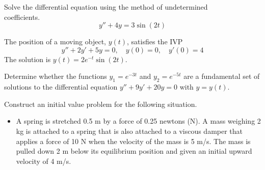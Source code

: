 \documentclass[12pt]{exam}
\begin{document}
\begin{questions}

    \newpage
    
    \question[8] Solve the differential equation using the method of undetermined \\coefficients. $$y'' + 4y = 3 \sin(2t)$$
    

    \newpage 
    

    \vspace{4cm} 
    
    \question[8] The position of a moving object, $y(t)$, satisfies the IVP $$y''+2y'+5y=0, \quad y(0) = 0, \quad y'(0) = 4$$ The solution is $y(t)= 2e^{-t}\sin(2t)$. 
    
    
    \newpage
    \question[2] Determine whether the functions $y_1 = e^{-3t}$ and $y_2 = e^{-5t}$ are a fundamental set of solutions to the differential equation $y''+9y'+20y = 0$ with $y=y(t)$. \vspace{4cm}
    
    \question[4]  Construct an initial value problem for the following situation. 

    \begin{itemize}
        \item[] A spring is stretched 0.5 m by a force of 0.25 newtons (N). A mass weighing 2 kg is attached to a spring that is also attached to a viscous damper that applies a force of 10 N when the velocity of the mass is 5 m/s. The mass is pulled down 2 m below its equilibrium position and given an initial upward velocity of 4 m/s. 
    \end{itemize}
    

\end{questions}
\end{document}
